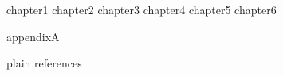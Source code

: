 \documentclass [MS] {uclathes}
\begin{document}
\makeintropages

  
 {chapter1}                       
 {chapter2}                      
 {chapter3}                       
 {chapter4}
 {chapter5}
 {chapter6}

 {appendixA}

 {plain}
 {references}
\end{document}
